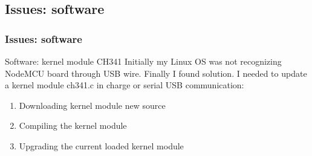 \documentclass[
    aspectratio=169,                   %
]{beamer}
\begin{document}
\subsection{Issues: software}

    \begin{frame}
        \frametitle{Issues: software}

        \begin{block}{Software: kernel module CH341}
            Initially my Linux OS was not recognizing NodeMCU board through USB wire. Finally I found solution.\cite{ch341} I needed to update a kernel module \alert{ch341.c} in charge or serial USB communication:
            \begin{enumerate}
                \item Downloading kernel module new source
                \item Compiling the kernel module
                \item Upgrading the current loaded kernel module
            \end{enumerate}
        \end{block}


    \end{frame}



            
\end{document}

